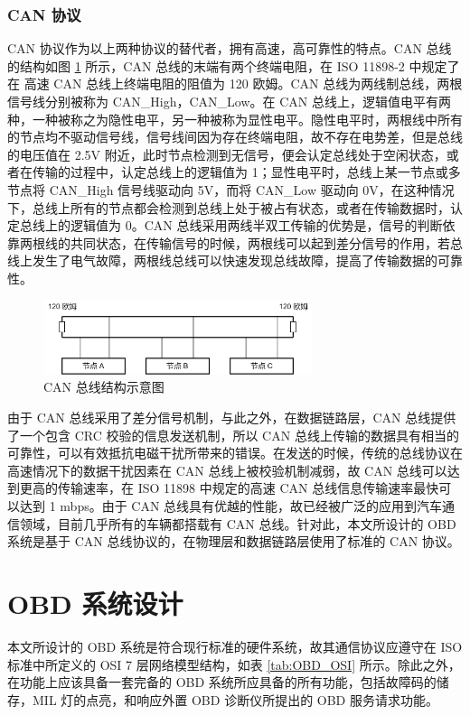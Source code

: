 \subsubsection{CAN 协议}
CAN 协议作为以上两种协议的替代者，拥有高速，高可靠性的特点。CAN 总线的结构如图 \ref{fig:CAN} 所示，CAN 总线的末端有两个终端电阻，在 ISO 11898-2 中规定了在 高速 CAN 总线上终端电阻的阻值为 120 欧姆。CAN 总线为两线制总线，两根信号线分别被称为 CAN\_High，CAN\_Low。在 CAN 总线上，逻辑值电平有两种，一种被称之为隐性电平，另一种被称为显性电平。隐性电平时，两根线中所有的节点均不驱动信号线，信号线间因为存在终端电阻，故不存在电势差，但是总线的电压值在 2.5V 附近，此时节点检测到无信号，便会认定总线处于空闲状态，或者在传输的过程中，认定总线上的逻辑值为 1；显性电平时，总线上某一节点或多节点将 CAN\_High 信号线驱动向 5V，而将 CAN\_Low 驱动向 0V，在这种情况下，总线上所有的节点都会检测到总线上处于被占有状态，或者在传输数据时，认定总线上的逻辑值为 0。CAN 总线采用两线半双工传输的优势是，信号的判断依靠两根线的共同状态，在传输信号的时候，两根线可以起到差分信号的作用，若总线上发生了电气故障，两根线总线可以快速发现总线故障，提高了传输数据的可靠性。

\begin{figure}
	\centering
	\includegraphics[width=0.7\textwidth]{figures/CAN.png}
	\caption{CAN 总线结构示意图}\label{fig:CAN}
\end{figure}

由于 CAN 总线采用了差分信号机制，与此之外，在数据链路层，CAN 总线提供了一个包含 CRC 校验的信息发送机制，所以 CAN 总线上传输的数据具有相当的可靠性，可以有效抵抗电磁干扰所带来的错误。在发送的时候，传统的总线协议在高速情况下的数据干扰因素在 CAN 总线上被校验机制减弱，故 CAN 总线可以达到更高的传输速率，在 ISO 11898 中规定的高速 CAN 总线信息传输速率最快可以达到 1 mbps。由于 CAN 总线具有优越的性能，故已经被广泛的应用到汽车通信领域，目前几乎所有的车辆都搭载有 CAN 总线。针对此，本文所设计的 OBD 系统是基于 CAN 总线协议的，在物理层和数据链路层使用了标准的 CAN 协议。

\section{OBD 系统设计}
本文所设计的 OBD 系统是符合现行标准的硬件系统，故其通信协议应遵守在 ISO 标准中所定义的 OSI 7 层网络模型结构，如表 \ref{tab:OBD_OSI} 所示。除此之外，在功能上应该具备一套完备的 OBD 系统所应具备的所有功能，包括故障码的储存，MIL 灯的点亮，和响应外置 OBD 诊断仪所提出的 OBD 服务请求功能。

